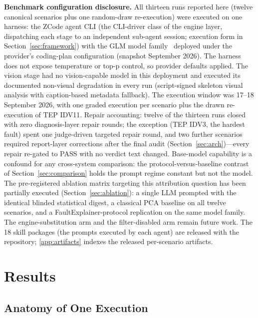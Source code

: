 \documentclass[preprint,10pt]{elsarticle}
\begin{document}
\textbf{Benchmark configuration disclosure.} All thirteen runs reported here (twelve canonical scenarios plus one random-draw re-execution) were executed on one harness: the ZCode agent CLI (the CLI-driver class of the engine layer, dispatching each stage to an independent sub-agent session; execution form in Section~\ref{sec:framework}) with the GLM model family~\cite{glm2024chatglm} deployed under the provider's coding-plan configuration (snapshot September 2026). The harness does not expose temperature or top-p control, so provider defaults applied. The vision stage had no vision-capable model in this deployment and executed its documented non-visual degradation in every run (script-signed skeleton visual analysis with caption-based metadata fallback). The execution window was 17--18 September 2026, with one graded execution per scenario plus the drawn re-execution of TEP IDV11. Repair accounting: twelve of the thirteen runs closed with zero diagnosis-layer repair rounds; the exception (TEP IDV3, the hardest fault) spent one judge-driven targeted repair round, and two further scenarios required report-layer corrections after the final audit (Section~\ref{sec:arch})---every repair re-gated to PASS with no verdict text changed. Base-model capability is a confound for any cross-system comparison: the protocol-versus-baseline contrast of Section~\ref{sec:comparison} holds the prompt regime constant but not the model. The pre-registered ablation matrix targeting this attribution question has been partially executed (Section~\ref{sec:ablation}): a single LLM prompted with the identical blinded statistical digest, a classical PCA baseline on all twelve scenarios, and a FaultExplainer-protocol replication on the same model family. The engine-substitution arm and the filter-disabled arm remain future work. The 18 skill packages (the prompts executed by each agent) are released with the repository; \ref{app:artifacts} indexes the released per-scenario artifacts.

\section{Results}
\label{sec:results}

\subsection{Anatomy of One Execution}
\label{sec:anatomy}
\end{document}
